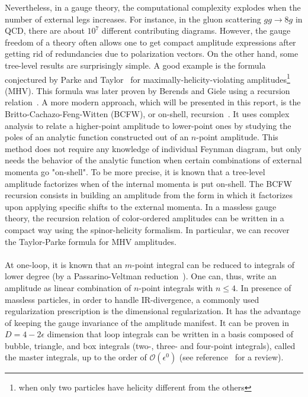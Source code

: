 Nevertheless, in a gauge theory, the computational complexity explodes when the number of external legs increases.
For instance, in the gluon scattering $gg\rightarrow 8g$ in QCD, there are about $10^7$ different contributing diagrams.
However, the gauge freedom of a theory often allows one to get compact amplitude expressions after getting rid of redundancies due to polarization vectors.
On the other hand, some tree-level results are surprisingly simple.
A good example is the formula conjectured by Parke and Taylor~\cite{PhysRevLett.56.2459} for maximally-helicity-violating amplitudes\footnote{
\ie when only two particles have helicity different from the others
}
(MHV).
This formula was later proven by Berends and Giele using a recursion relation~\cite{BERENDS1988759,KOSOWER199023}.
A more modern approach, which will be presented in this report, is the Britto-Cachazo-Feng-Witten (BCFW), or on-shell, recursion~\cite{BRITTO2005499, PhysRevLett.94.181602}.
It uses complex analysis to relate a higher-point amplitude to lower-point ones by studying the poles of an analytic function constructed out of an $n$-point amplitude.
This method does not require any knowledge of individual Feynman diagram, but only needs the behavior of the analytic function when certain combinations of external momenta go "on-shell". 
To be more precise, it is known that a tree-level amplitude factorizes when of the internal momenta is put on-shell.
The BCFW recursion consists in building an amplitude from the form in which it factorizes upon applying specific shifts to the external momenta.
In a massless gauge theory, the recursion relation of color-ordered amplitudes can be written in a compact way using the spinor-helicity formalism.
In particular, we can recover the Taylor-Parke formula for MHV amplitudes.
\\\\
At one-loop,
it is known that an $m$-point integral can be reduced to integrals of lower degree (\eg by a Passarino-Veltman reduction~\cite{PASSARINO1979151}). 
One can, thus, write an amplitude as linear combination of $n$-point integrals with $n\leq 4$.
In presence of massless particles, in order to handle IR-divergence, a commonly used regularization prescription is the dimensional regularization.
It has the advantage of keeping the gauge invariance of the amplitude manifest.
It can be proven in $D = 4-2\epsilon$ dimension that loop integrals can be written in a basis composed of bubble, triangle, and box integrals (\ie two-, three- and four-point integrals), called the master integrals, up to the order of $\mathcal{O}(\epsilon^0)$ (see \eg reference~\cite{Gluza:2010ws} for a review).
